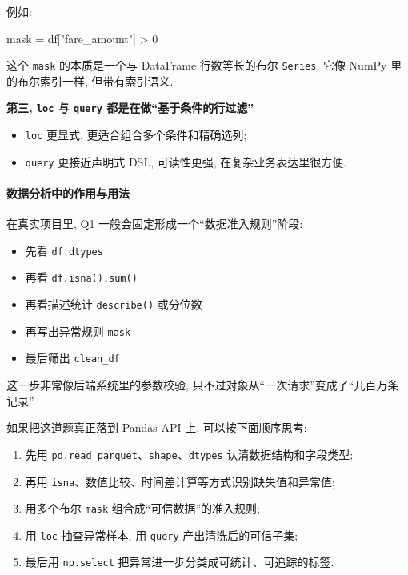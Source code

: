 \documentclass[11pt]{article}
\providecommand{\tightlist}{%
      \setlength{\itemsep}{0pt}\setlength{\parskip}{0pt}}
\newenvironment{Shaded}{}{}
\newcommand{\DecValTok}[1]{\textcolor[rgb]{0.25,0.63,0.44}{{#1}}}
\newcommand{\StringTok}[1]{\textcolor[rgb]{0.25,0.44,0.63}{{#1}}}
\newcommand{\NormalTok}[1]{{#1}}
\newcommand{\OperatorTok}[1]{\textcolor[rgb]{0.40,0.40,0.40}{{#1}}}
\begin{document}
例如:

\begin{Shaded}
\begin{Highlighting}[]
\NormalTok{mask }\OperatorTok{=}\NormalTok{ df[}\StringTok{"fare\_amount"}\NormalTok{] }\OperatorTok{\textgreater{}} \DecValTok{0}
\end{Highlighting}
\end{Shaded}

这个 \texttt{mask} 的本质是一个与 DataFrame 行数等长的布尔
\texttt{Series}, 它像 NumPy 里的布尔索引一样, 但带有索引语义.

\textbf{第三, \texttt{loc} 与 \texttt{query}
都是在做``基于条件的行过滤''}

\begin{itemize}
\tightlist
\item
  \texttt{loc} 更显式, 更适合组合多个条件和精确选列;
\item
  \texttt{query} 更接近声明式 DSL, 可读性更强, 在复杂业务表达里很方便.
\end{itemize}

    \paragraph{数据分析中的作用与用法}\label{ux6570ux636eux5206ux6790ux4e2dux7684ux4f5cux7528ux4e0eux7528ux6cd5}

    在真实项目里, Q1 一般会固定形成一个``数据准入规则''阶段:

\begin{itemize}
\tightlist
\item
  先看 \texttt{df.dtypes}
\item
  再看 \texttt{df.isna().sum()}
\item
  再看描述统计 \texttt{describe()} 或分位数
\item
  再写出异常规则 \texttt{mask}
\item
  最后筛出 \texttt{clean\_df}
\end{itemize}

这一步非常像后端系统里的参数校验,
只不过对象从``一次请求''变成了``几百万条记录''.

如果把这道题真正落到 Pandas API 上, 可以按下面顺序思考:

\begin{enumerate}
\def\labelenumi{\arabic{enumi}.}
\tightlist
\item
  先用 \texttt{pd.read\_parquet}、\texttt{shape}、\texttt{dtypes}
  认清数据结构和字段类型;
\item
  再用 \texttt{isna}、数值比较、时间差计算等方式识别缺失值和异常值;
\item
  用多个布尔 \texttt{mask} 组合成``可信数据''的准入规则;
\item
  用 \texttt{loc} 抽查异常样本, 用 \texttt{query} 产出清洗后的可信子集;
\item
  最后用 \texttt{np.select} 把异常进一步分类成可统计、可追踪的标签.
\end{enumerate}
\end{document}
